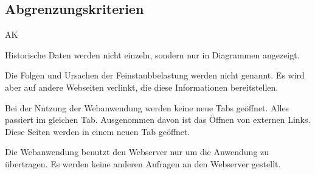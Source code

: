 \subsection{Abgrenzungskriterien}
\setcounter{counter}{10}
\begin{Kriterien}{AK}

	\item Historische Daten werden nicht einzeln, sondern nur in Diagrammen angezeigt.
	
	\item Die Folgen und Ursachen der Feinstaubbelastung werden nicht genannt. Es wird aber auf andere Webseiten verlinkt, die diese
	Informationen bereitstellen.
	
	\item Bei der Nutzung der \gls{Webanwendung} werden keine neue Tabs geöffnet. Alles passiert im gleichen Tab. Ausgenommen 
	davon ist das Öffnen von externen Links. Diese Seiten werden in einem neuen Tab geöffnet.
	
	\item Die \gls{Webanwendung} benutzt den \gls{Webserver} nur um die Anwendung zu übertragen. Es werden keine anderen Anfragen 
	an den \gls{Webserver} gestellt.
	
\end{Kriterien}
